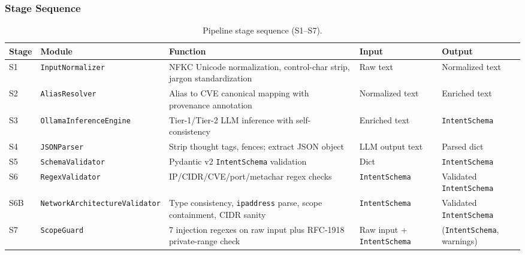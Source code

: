 ﻿\documentclass[10pt,journal,onecolumn]{IEEEtran}
\begin{document}
\subsubsection{Stage Sequence}
\begin{table}[t]
\caption{Pipeline stage sequence (S1--S7).}
\label{tab:stages}
\begin{tabularx}{\textwidth}{l l X X X}
\toprule
\textbf{Stage} & \textbf{Module} & \textbf{Function} & \textbf{Input} & \textbf{Output}\\
\midrule
S1 & \texttt{InputNormalizer} & NFKC Unicode normalization, control-char strip, jargon standardization & Raw text & Normalized text\\
S2 & \texttt{AliasResolver} & Alias to CVE canonical mapping with provenance annotation & Normalized text & Enriched text\\
S3 & \texttt{OllamaInferenceEngine} & Tier-1/Tier-2 LLM inference with self-consistency & Enriched text & \texttt{IntentSchema}\\
S4 & \texttt{JSONParser} & Strip thought tags, fences; extract JSON object & LLM output text & Parsed dict\\
S5 & \texttt{SchemaValidator} & Pydantic v2 \texttt{IntentSchema} validation & Dict & \texttt{IntentSchema}\\
S6 & \texttt{RegexValidator} & IP/CIDR/CVE/port/metachar regex checks & \texttt{IntentSchema} & Validated \texttt{IntentSchema}\\
S6B & \texttt{NetworkArchitectureValidator} & Type consistency, \texttt{ipaddress} parse, scope containment, CIDR sanity & \texttt{IntentSchema} & Validated \texttt{IntentSchema}\\
S7 & \texttt{ScopeGuard} & 7 injection regexes on raw input plus RFC-1918 private-range check & Raw input + \texttt{IntentSchema} & (\texttt{IntentSchema}, warnings)\\
\bottomrule
\end{tabularx}
\end{table}
\end{document}
